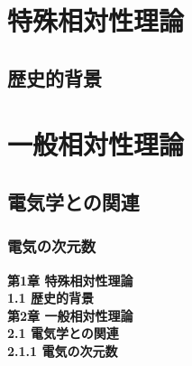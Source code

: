 
\begin{inonly}
\chapter{特殊相対性理論}
  \section{歴史的背景}
\chapter{一般相対性理論}
  \section{電気学との関連}
    \subsection{電気の次元数}
\end{inonly}
\begin{outonly}
{\Large \textbf{第1章 特殊相対性理論}}\\
{\large \textbf{1.1 歴史的背景}}\\
{\Large \textbf{第2章 一般相対性理論}}\\
{\large \textbf{2.1 電気学との関連}}\\
{\normalsize \textbf{2.1.1 電気の次元数}}
\end{outonly}%

